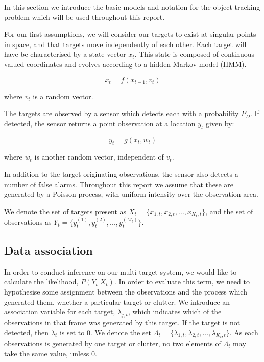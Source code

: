 In this section we introduce the basic models and notation for the object tracking problem which will be used throughout this report.

For our first assumptions, we will consider our targets to exist at singular points in space, and that targets move independently of each other. Each target will have be characterised by a state vector $x_t$. This state is composed of continuous-valued coordinates and evolves according to a hidden Markov model (HMM).

\begin{equation}
x_t = f(x_{t-1}, v_t)
\end{equation}

where $v_t$ is a random vector.

The targets are observed by a sensor which detects each with a probability $P_D$. If detected, the sensor returns a point observation at a location $y_t$ given by:

\begin{equation}
y_t = g(x_t, w_t)
\end{equation}

where $w_t$ is another random vector, independent of $v_t$.

In addition to the target-originating observations, the sensor also detects a number of false alarms. Throughout this report we assume that these are generated by a Poisson process, with uniform intensity over the observation area.

We denote the set of targets present as $X_t = \{x_{1,t}, x_{2,t}, ... , x_{K_t, t} \}$, and the set of observations as $Y_t = \{y_t^{(1)}, y_t^{(2)}, ... , y_t^{(M_t)} \}$.



\subsection{Data association}

In order to conduct inference on our multi-target system, we would like to calculate the likelihood, $P(Y_t|X_t)$. In order to evaluate this term, we need to hypothesise some assignment between the observations and the process which generated them, whether a particular target or clutter. We introduce an association variable for each target, $\lambda_{j,t}$, which indicates which of the observations in that frame was generated by this target. If the target is not detected, then $\lambda_t$ is set to 0. We denote the set $\Lambda_t = \{\lambda_{1,t}, \lambda_{2,t}, ... , \lambda_{K_t, t} \}$. As each observations is generated by one target or clutter, no two elements of $\Lambda_t$ may take the same value, unless 0.

